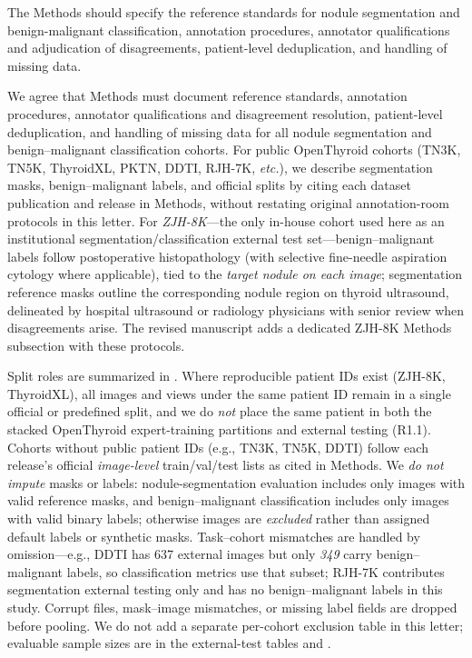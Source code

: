 \begin{reviewercomment}
The Methods should specify the reference standards for nodule segmentation and benign-malignant classification, annotation procedures, annotator qualifications and adjudication of disagreements, patient-level deduplication, and handling of missing data.
\end{reviewercomment}
\begin{authorresponse}
We agree that Methods must document reference standards, annotation procedures, annotator qualifications and disagreement resolution, patient-level deduplication, and handling of missing data for all nodule segmentation and benign--malignant classification cohorts. For public OpenThyroid cohorts (TN3K, TN5K, ThyroidXL, PKTN, DDTI, RJH-7K, \textit{etc.}), we describe segmentation masks, benign--malignant labels, and official splits by citing each dataset publication and release in Methods, without restating original annotation-room protocols in this letter. For \emph{ZJH-8K}---the only in-house cohort used here as an institutional segmentation/classification external test set---benign--malignant labels follow postoperative histopathology (with selective fine-needle aspiration cytology where applicable), tied to the \emph{target nodule on each image}; segmentation reference masks outline the corresponding nodule region on thyroid ultrasound, delineated by hospital ultrasound or radiology physicians with senior review when disagreements arise. The revised manuscript adds a dedicated ZJH-8K Methods subsection with these protocols.\par
Split roles are summarized in . Where reproducible patient IDs exist (ZJH-8K, ThyroidXL), all images and views under the same patient ID remain in a single official or predefined split, and we do \emph{not} place the same patient in both the stacked OpenThyroid expert-training partitions and external testing (R1.1). Cohorts without public patient IDs (e.g., TN3K, TN5K, DDTI) follow each release's official \emph{image-level} train/val/test lists as cited in Methods. We \emph{do not impute} masks or labels: nodule-segmentation evaluation includes only images with valid reference masks, and benign--malignant classification includes only images with valid binary labels; otherwise images are \emph{excluded} rather than assigned default labels or synthetic masks. Task--cohort mismatches are handled by omission---e.g., DDTI has 637 external images but only \emph{349} carry benign--malignant labels, so classification metrics use that subset; RJH-7K contributes segmentation external testing only and has no benign--malignant labels in this study. Corrupt files, mask--image mismatches, or missing label fields are dropped before pooling. We do not add a separate per-cohort exclusion table in this letter; evaluable sample sizes are in the external-test tables and .\par

\end{authorresponse}
